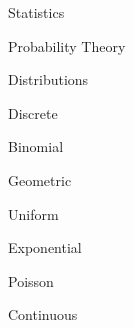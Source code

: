 \documentclass[11pt]{article}
\begin{document}
\begin{enumerate}
    \begin{item}
      Statistics

      \begin{enumerate}

          \begin{item}
            Probability Theory
          \end{item}

          \begin{item}

            Distributions

            \begin{enumerate}

                \begin{item}

                  Discrete

                  \begin{enumerate}

                      \begin{item}
                        Binomial
                      \end{item}

                      \begin{item}
                        Geometric
                      \end{item}

                      \begin{item}
                        Uniform
                      \end{item}

                      \begin{item}
                        Exponential
                      \end{item}

                      \begin{item}
                        Poisson
                      \end{item}

                  \end{enumerate}

                \end{item}

                \begin{item}

                  Continuous

                  \begin{enumerate}


\end{enumerate}
\end{item}
\end{enumerate}
\end{item}
\end{enumerate}
\end{item}
\end{enumerate}
\end{document}
